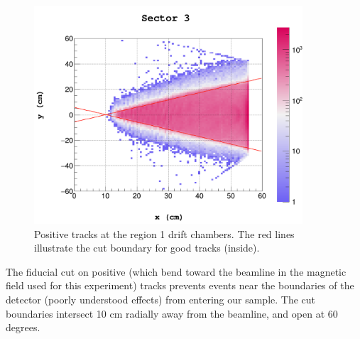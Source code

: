 \begin{figure}
  \begin{center}
    \includegraphics[width=10cm]{image/kp/DCR1Sector3.png}
    \caption{ Positive tracks at the region 1 drift chambers. The red lines illustrate the cut boundary for good tracks (inside).  }
  \end{center}
\end{figure}

The fiducial cut on positive (which bend toward the beamline in the magnetic field used for this experiment) tracks prevents events near the boundaries of the detector (poorly understood effects) from entering our sample.  The cut boundaries intersect 10 cm radially away from the beamline, and open at 60 degrees. 

